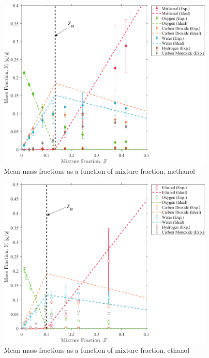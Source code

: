 \documentclass[12pt]{article}
\begin{document}
\begin{figure}[!]
	\centering
\includegraphics[width=11.0cm,keepaspectratio]{Methanol_OVERALL_Mass_Frac_Mix_Frac.png}
	\caption[Mean mass fractions as a function of mixture fraction, methanol]{Mean mass fractions as a function of mixture fraction, methanol}
	\label{fig:Methanol_Mix_Frac}
\end{figure}

\begin{figure}[!]
	\centering
\includegraphics[width=11.0cm,keepaspectratio]{Ethanol_OVERALL_Mass_Frac_Mix_Frac.png}
	\caption[Mean mass fractions as a function of mixture fraction, ethanol]{Mean mass fractions as a function of mixture fraction, ethanol}
	\label{fig:Ethanol_Mix_Frac}
\end{figure}
\end{document}
